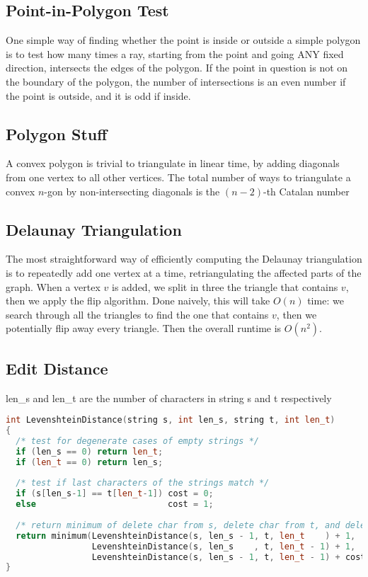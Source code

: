 \documentclass[10pt,a4paper]{article}
\begin{document}
\subsection*{Point-in-Polygon Test}
One simple way of finding whether the point is inside or outside a simple polygon is to test how many times a ray, starting from the point and going ANY fixed direction, intersects the edges of the polygon. If the point in question is not on the boundary of the polygon, the number of intersections is an even number if the point is outside, and it is odd if inside. 


\subsection*{Polygon Stuff}
A convex polygon is trivial to triangulate in linear time, by adding diagonals from one vertex to all other vertices.
The total number of ways to triangulate a convex $n$-gon by non-intersecting diagonals is the $(n - 2)$-th Catalan number

\subsection*{Delaunay Triangulation}
The most straightforward way of efficiently computing the Delaunay triangulation is to repeatedly add one vertex at a time, retriangulating the affected parts of the graph. When a vertex $v$ is added, we split in three the triangle that contains $v$, then we apply the flip algorithm. Done naively, this will take $O(n)$ time: we search through all the triangles to find the one that contains $v$, then we potentially flip away every triangle. Then the overall runtime is $O(n^2)$.

\subsection*{Edit Distance}
len\_s and len\_t are the number of characters in string s and t respectively

\begin{lstlisting}[language=C++]
int LevenshteinDistance(string s, int len_s, string t, int len_t)
{
  /* test for degenerate cases of empty strings */
  if (len_s == 0) return len_t;
  if (len_t == 0) return len_s;
 
  /* test if last characters of the strings match */
  if (s[len_s-1] == t[len_t-1]) cost = 0;
  else                          cost = 1;
 
  /* return minimum of delete char from s, delete char from t, and delete char from both */
  return minimum(LevenshteinDistance(s, len_s - 1, t, len_t    ) + 1,
                 LevenshteinDistance(s, len_s    , t, len_t - 1) + 1,
                 LevenshteinDistance(s, len_s - 1, t, len_t - 1) + cost);
}
\end{lstlisting}
\end{document}
